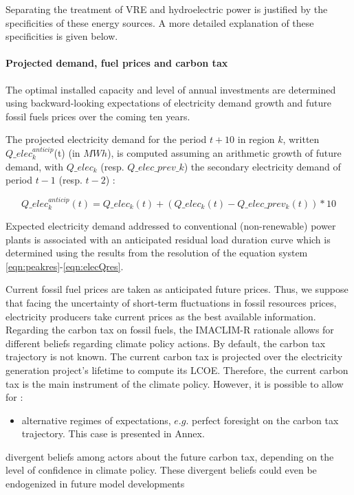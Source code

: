 Separating the treatment of VRE and hydroelectric power is justified by the specificities of these energy sources. A more detailed explanation of these specificities is given below.

\paragraph{Projected demand, fuel prices and carbon tax}

The optimal installed capacity and level of annual investments are determined using backward-looking expectations of electricity demand growth and  future fossil fuels prices over the coming ten years.

The projected electricity demand for the period $t+10$ in region $k$, written $Q\_elec_k^{anticip}$(t) (in $MWh$), is computed assuming an arithmetic growth of future demand, with $Q\_elec_k$ (resp. $Q\_elec\_prev\_k$) the secondary electricity demand of period $t-1$ (resp. $t-2$)  : 

\begin{dmath}
    Q\_elec_k^{anticip}(t) = Q\_elec_k(t) + (Q\_elec_k(t) - Q\_elec\_prev_k(t))*10
    \label{eqn:elecQAnticip}
\end{dmath}

Expected electricity demand addressed to conventional (non-renewable) power plants is associated with an anticipated residual load duration curve which is determined using the results from the resolution of the equation system \ref{eqn:peakres}-\ref{eqn:elecQres}.

Current fossil fuel prices are taken as anticipated future prices. Thus, we suppose that facing the uncertainty of short-term fluctuations in fossil resources prices, electricity producers take current prices as the best available information. 
Regarding the carbon tax on fossil fuels, the IMACLIM-R rationale allows for different beliefs regarding climate policy actions. By default, the carbon tax trajectory is not known. The current carbon tax is projected over the electricity generation project's lifetime to compute its LCOE. Therefore, the current carbon tax is the main instrument of the climate policy. However, it is possible to allow for :
\begin{itemize}
    \item alternative regimes of expectations, $e.g.$ perfect foresight on the carbon tax trajectory. This case is presented in Annex.
\end{itemize} divergent beliefs among actors about the future carbon tax, depending on the level of confidence in climate policy. These divergent beliefs could even be endogenized in future model developments

